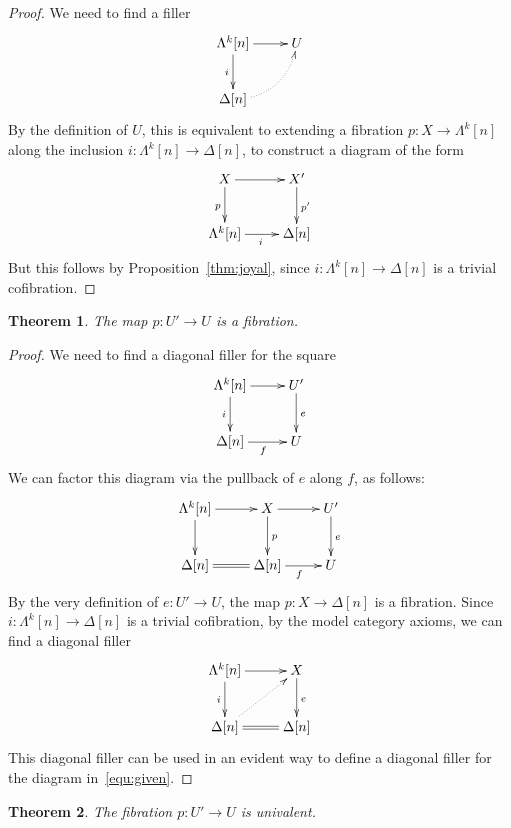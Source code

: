 \documentclass[reqno,10pt,a4paper,oneside]{amsart}
\newcommand{\xycenter}[1]{\vcenter{\hbox{\xymatrix{#1}}}}
\newcommand{\ie}{\text{i.e.\ }}
\newtheorem{theorem}{Theorem}[section]
\theoremstyle{definition}
\newcommand{\co}{\colon}
\newcommand{\Ub}{U'}
\begin{document}
\begin{proof} We need to find a filler
\[
\xymatrix{
\Lambda^k[n] \ar[r] \ar[d]_{i} & U \\
\Delta[n] \ar@/_1pc/@{.>}[ur] & }
\]
By the definition of $U$, this is equivalent to extending a fibration $p \co X \to \Lambda^k[n]$ 
along the inclusion $i \co \Lambda^k[n] \to \Delta[n]$, \ie to construct a diagram of the form
\[
\xymatrix{
X \ar[r] \ar[d]_{p} & X' \ar[d]^{p'} \\ 
\Lambda^k[n] \ar[r]_{i} & \Delta[n] }
\]
But this follows by Proposition~\ref{thm:joyal}, since $i  \co \Lambda^k[n] \to \Delta[n]$ is a trivial cofibration.
\end{proof}

\begin{theorem} The map $p \co \Ub \to U$ is a fibration.
\end{theorem}

\begin{proof} We need to find a diagonal filler for the square
\begin{equation}
\label{equ:given}
\xycenter{
\Lambda^k[n] \ar[r] \ar[d]_i & \Ub \ar[d]^e \\
\Delta[n] \ar[r]_f & U }
\end{equation}
We can factor this diagram via the pullback of $e$ along $f$, as follows:
\[
\xymatrix{
\Lambda^k[n] \ar[r] \ar[d] & X \ar[r] \ar[d]^p &  \Ub \ar[d]^e \\ 
\Delta[n] \ar@{=}[r] & \Delta[n] \ar[r]_f & U }
\]
By the very definition of $e \co \Ub \to U$, the map $p \co X \to \Delta[n]$ is a fibration. 
Since  $i  \co \Lambda^k[n] \to \Delta[n]$ is a trivial cofibration, by
the model category axioms, we can find a diagonal filler 
\[
\xymatrix{
  \Lambda^k[n]   \ar[r] \ar[d]_i &  X \ar[d]^e \\ 
 \Delta[n]  \ar@{=}[r] \ar@{.>}[ur] & \Delta[n] }
\]
This diagonal filler can be used in an evident way to define a diagonal filler for the diagram in~\eqref{equ:given}.
\end{proof}


\begin{theorem} The fibration  $p \co \Ub \to U$ is univalent.
\end{theorem}
\end{document}
